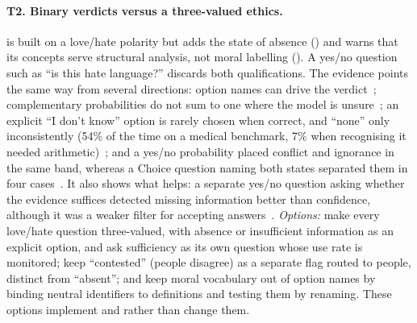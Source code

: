 \paragraph{T2. Binary verdicts versus a three-valued ethics.}
\pol{} is built on a love/hate polarity but adds the state of absence () and warns that its concepts serve structural analysis, not moral labelling ().
A yes/no question such as ``is this hate language?'' discards both qualifications.
The evidence points the same way from several directions: option names can drive the verdict~\cite{arx26758,arx00346}; complementary probabilities do not sum to one where the model is unsure~\cite{arx33209}; an explicit ``I don't know'' option is rarely chosen when correct, and ``none'' only inconsistently (54\% of the time on a medical benchmark, 7\% when recognising it needed arithmetic)~\cite{arx34024,arx39496}; and a yes/no probability placed conflict and ignorance in the same band, whereas a Choice question naming both states separated them in four cases~\cite{zen22848952}\zmark{}.
It also shows what helps: a separate yes/no question asking whether the evidence suffices detected missing information better than confidence, although it was a weaker filter for accepting answers~\cite{arx01006}.
\emph{Options:} make every love/hate question three-valued, with absence or insufficient information as an explicit option, and ask sufficiency as its own question whose use rate is monitored; keep ``contested'' (people disagree) as a separate flag routed to people, distinct from ``absent''; and keep moral vocabulary out of option names by binding neutral identifiers to definitions and testing them by renaming.
These options implement  and  rather than change them.

